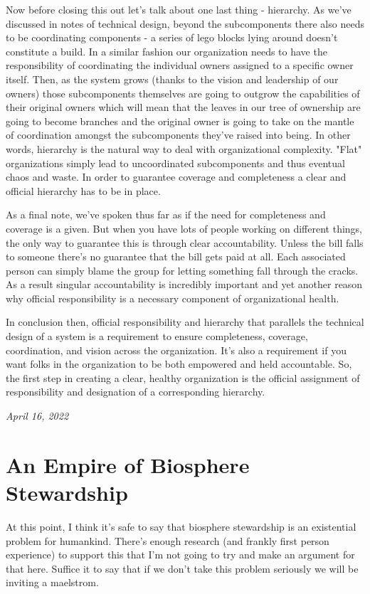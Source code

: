 \documentclass[10pt,a5paper]{book}
\begin{document}
Now before closing this out let's talk about one last thing - hierarchy. As we've discussed in notes of technical design, beyond the subcomponents there also needs to be coordinating components - a series of lego blocks lying around doesn't constitute a build. In a similar fashion our organization needs to have the responsibility of coordinating the individual owners assigned to a specific owner itself. Then, as the system grows (thanks to the vision and leadership of our owners) those subcomponents themselves are going to outgrow the capabilities of their original owners which will mean that the leaves in our tree of ownership are going to become branches and the original owner is going to take on the mantle of coordination amongst the subcomponents they've raised into being. In other words, hierarchy is the natural way to deal with organizational complexity. "Flat" organizations simply lead to uncoordinated subcomponents and thus eventual chaos and waste. In order to guarantee coverage and completeness a clear and official hierarchy has to be in place.

As a final note, we've spoken thus far as if the need for completeness and coverage is a given. But when you have lots of people working on different things, the only way to guarantee this is through clear accountability. Unless the bill falls to someone there's no guarantee that the bill gets paid at all. Each associated person can simply blame the group for letting something fall through the cracks. As a result singular accountability is incredibly important and yet another reason why official responsibility is a necessary component of organizational health.

In conclusion then, official responsibility and hierarchy that parallels the technical design of a system is a requirement to ensure completeness, coverage, coordination, and vision across the organization. It's also a requirement if you want folks in the organization to be both empowered and held accountable. So, the first step in creating a clear, healthy organization is the official assignment of responsibility and designation of a corresponding hierarchy.

\textit{April 16, 2022}

\section{An Empire of Biosphere Stewardship}

At this point, I think it's safe to say that biosphere stewardship is an existential problem for humankind. There's enough research (and frankly first person experience) to support this that I'm not going to try and make an argument for that here. Suffice it to say that if we don't take this problem seriously we will be inviting a maelstrom. 
\end{document}
